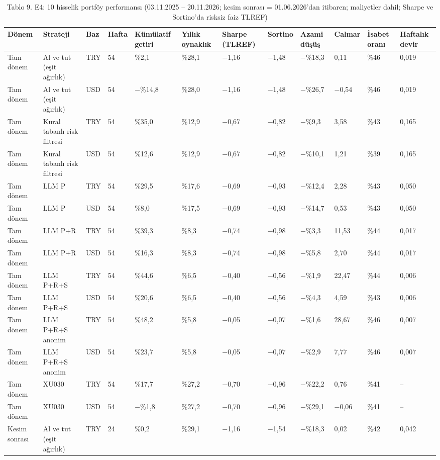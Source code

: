 \begin{table}
\caption{Tablo 9. E4: 10 hisselik portföy performansı (03.11.2025 – 20.11.2026; kesim sonrası = 01.06.2026'dan itibaren; maliyetler dahil; Sharpe ve Sortino'da risksiz faiz TLREF)}
\label{tab:tablo_09_e4_performans}
\begin{tabular}{llllllllllll}
\toprule
Dönem & Strateji & Baz & Hafta & Kümülatif getiri & Yıllık oynaklık & Sharpe (TLREF) & Sortino & Azami düşüş & Calmar & İsabet oranı & Haftalık devir \\
\midrule
Tam dönem & Al ve tut (eşit ağırlık) & TRY & 54 & \%2,1 & \%28,1 & −1,16 & −1,48 & −\%18,3 & 0,11 & \%46 & 0,019 \\
Tam dönem & Al ve tut (eşit ağırlık) & USD & 54 & −\%14,8 & \%28,0 & −1,16 & −1,48 & −\%26,7 & −0,54 & \%46 & 0,019 \\
Tam dönem & Kural tabanlı risk filtresi & TRY & 54 & \%35,0 & \%12,9 & −0,67 & −0,82 & −\%9,3 & 3,58 & \%43 & 0,165 \\
Tam dönem & Kural tabanlı risk filtresi & USD & 54 & \%12,6 & \%12,9 & −0,67 & −0,82 & −\%10,1 & 1,21 & \%39 & 0,165 \\
Tam dönem & LLM P & TRY & 54 & \%29,5 & \%17,6 & −0,69 & −0,93 & −\%12,4 & 2,28 & \%43 & 0,050 \\
Tam dönem & LLM P & USD & 54 & \%8,0 & \%17,5 & −0,69 & −0,93 & −\%14,7 & 0,53 & \%43 & 0,050 \\
Tam dönem & LLM P+R & TRY & 54 & \%39,3 & \%8,3 & −0,74 & −0,98 & −\%3,3 & 11,53 & \%44 & 0,017 \\
Tam dönem & LLM P+R & USD & 54 & \%16,3 & \%8,3 & −0,74 & −0,98 & −\%5,8 & 2,70 & \%44 & 0,017 \\
Tam dönem & LLM P+R+S & TRY & 54 & \%44,6 & \%6,5 & −0,40 & −0,56 & −\%1,9 & 22,47 & \%44 & 0,006 \\
Tam dönem & LLM P+R+S & USD & 54 & \%20,6 & \%6,5 & −0,40 & −0,56 & −\%4,3 & 4,59 & \%43 & 0,006 \\
Tam dönem & LLM P+R+S anonim & TRY & 54 & \%48,2 & \%5,8 & −0,05 & −0,07 & −\%1,6 & 28,67 & \%46 & 0,007 \\
Tam dönem & LLM P+R+S anonim & USD & 54 & \%23,7 & \%5,8 & −0,05 & −0,07 & −\%2,9 & 7,77 & \%46 & 0,007 \\
Tam dönem & XU030 & TRY & 54 & \%17,7 & \%27,2 & −0,70 & −0,96 & −\%22,2 & 0,76 & \%41 & – \\
Tam dönem & XU030 & USD & 54 & −\%1,8 & \%27,2 & −0,70 & −0,96 & −\%29,1 & −0,06 & \%41 & – \\
Kesim sonrası & Al ve tut (eşit ağırlık) & TRY & 24 & \%0,2 & \%29,1 & −1,16 & −1,54 & −\%18,3 & 0,02 & \%42 & 0,042 \\

\end{tabular}
\end{table}
